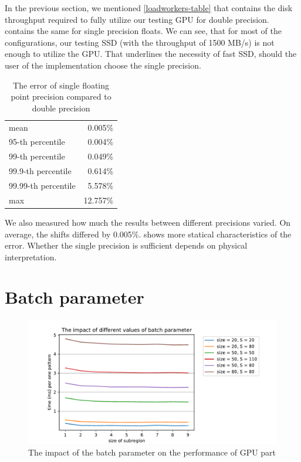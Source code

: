 In the previous section, we mentioned \cref{loadworkers-table} that contains the disk throughput required to fully utilize our testing GPU for double precision.   contains the same for single precision floats. We can see, that for most of the configurations, our testing SSD (with the throughput of 1500 MB/s) is not enough to utilize the GPU. That underlines the necessity of fast SSD, should the user of the implementation choose the single precision.



\begin{table}[]
	\centering
	\begin{tabular}{@{}l|r@{}}
		mean               & 0.005\% \\
		95-th percentile   & 0.004\% \\
		99-th percentile   & 0.049\% \\
		99.9-th percentile & 0.614\% \\
		99.99-th percentile & 5.578\% \\
		max                &  12.757\%
	\end{tabular}
	\caption{The error of single floating point precision compared to double precision}
	\label{float-error}
\end{table}

We also measured how much the results between different precisions varied. On average, the shifts differed by 0.005\%.  shows more statical characteristics of the error. Whether the single precision is sufficient depends on physical interpretation.


\section{Batch parameter}
\label{batch-param-eval}

\begin{figure}
	\centering
	\includegraphics[width=\textwidth]{img/eval/batch-plot}
	\caption{The impact of the batch parameter on the performance of GPU part}
	\label{batch-plot}
\end{figure}



